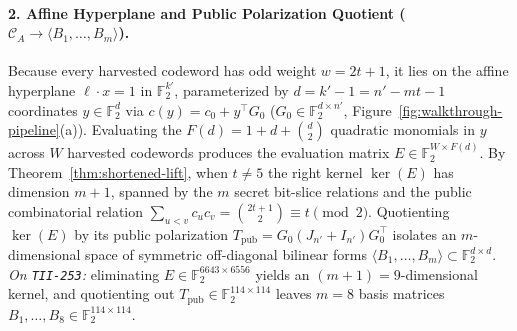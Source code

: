 \documentclass[11pt,a4paper]{article}
\theoremstyle{definition}
\theoremstyle{remark}
\newcommand{\F}{\mathbb{F}}
\begin{document}
\paragraph{2. Affine Hyperplane and Public Polarization Quotient ($\mathcal{C}_A \to \langle B_1, \dots, B_m \rangle$).}
Because every harvested codeword has odd weight $w = 2t + 1$, it lies on the affine hyperplane $\ell \cdot x = 1$ in $\F_2^{k'}$, parameterized by $d = k' - 1 = n' - mt - 1$ coordinates $y \in \F_2^d$ via $c(y) = c_0 + y^\top G_0$ ($G_0 \in \F_2^{d \times n'}$, Figure~\ref{fig:walkthrough-pipeline}(a)). Evaluating the $F(d) = 1 + d + \binom{d}{2}$ quadratic monomials in $y$ across $W$ harvested codewords produces the evaluation matrix $E \in \F_2^{W \times F(d)}$. By Theorem~\ref{thm:shortened-lift}, when $t \neq 5$ the right kernel $\ker(E)$ has dimension $m + 1$, spanned by the $m$ secret bit-slice relations and the public combinatorial relation $\sum_{u < v} c_u c_v = \binom{2t+1}{2} \equiv t \pmod 2$. Quotienting $\ker(E)$ by its public polarization $T_{\text{pub}} = G_0(J_{n'} + I_{n'})G_0^\top$ isolates an $m$-dimensional space of symmetric off-diagonal bilinear forms $\langle B_1, \dots, B_m \rangle \subset \F_2^{d \times d}$.
\emph{On \texttt{TII-253}:} eliminating $E \in \F_2^{6643 \times 6556}$ yields an $(m + 1) = 9$-dimensional kernel, and quotienting out $T_{\text{pub}} \in \F_2^{114 \times 114}$ leaves $m = 8$ basis matrices $B_1, \dots, B_8 \in \F_2^{114 \times 114}$.
\end{document}
